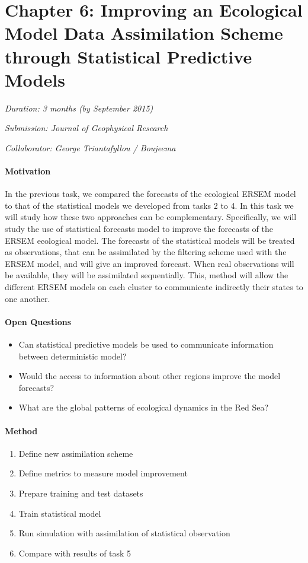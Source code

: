 \section{Chapter 6: Improving an Ecological Model Data Assimilation Scheme through Statistical Predictive Models}

\noindent
\emph{Duration: 3 months (by September 2015)}

\noindent
\emph{Submission: Journal of Geophysical Research}

\noindent
\emph{Collaborator: George Triantafyllou / Boujeema}

\paragraph{Motivation}

In the previous task, we compared the forecasts of the ecological ERSEM model to that of the statistical models we developed from tasks 2 to 4. In this task we will study how these two approaches can be complementary. Specifically, we will study the use of statistical forecasts model to improve the forecasts of the ERSEM ecological model. The forecasts of the statistical models will be treated as observations, that can be assimilated by the filtering scheme used with the ERSEM model, and will give an improved forecast. When real observations will be available, they will be assimilated sequentially. This, method will allow the different ERSEM models on each cluster to communicate indirectly their states to one another. 

\paragraph{Open Questions}

\begin{itemize}
\item Can statistical predictive models be used to communicate information between deterministic model?
\item Would the access to information about other regions improve the model forecasts?
\item What are the global patterns of ecological dynamics in the Red Sea?
\end{itemize}

\paragraph{Method}

\begin{enumerate}
\item Define new assimilation scheme
\item Define metrics to measure model improvement
\item Prepare training and test datasets
\item Train statistical model
\item Run simulation with assimilation of statistical observation
\item Compare with results of task 5
\end{enumerate}

